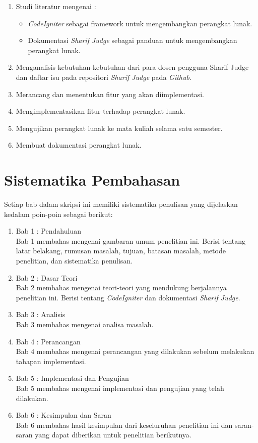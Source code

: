\begin{enumerate}
	\item Studi literatur mengenai :
		\begin{itemize}
			\item \textit{CodeIgniter} sebagai framework untuk mengembangkan perangkat lunak.
			\item Dokumentasi \textit{Sharif Judge} sebagai panduan untuk mengembangkan perangkat lunak.
		\end{itemize}
	\item Menganalisis kebutuhan-kebutuhan dari para dosen pengguna Sharif Judge dan daftar isu pada repositori \textit{Sharif Judge} pada \textit{Github}.
	\item Merancang dan menentukan fitur yang akan diimplementasi.
	\item Mengimplementasikan fitur terhadap perangkat lunak.
	\item Mengujikan perangkat lunak ke mata kuliah selama satu semester.
	\item Membuat dokumentasi perangkat lunak.
\end{enumerate}

\section{Sistematika Pembahasan}
\label{sec:sispem}
Setiap bab dalam skripsi ini memiliki sistematika penulisan yang dijelaskan kedalam poin-poin sebagai berikut:

\begin{enumerate}
	\item Bab 1 : Pendahuluan \\
	Bab 1 membahas mengenai gambaran umum penelitian ini. Berisi tentang latar belakang, rumusan masalah, tujuan, batasan masalah, metode penelitian, dan sistematika penulisan.
	
	\item Bab 2 : Dasar Teori \\
	Bab 2 membahas mengenai teori-teori yang mendukung berjalannya penelitian ini. Berisi tentang \textit{CodeIgniter} dan dokumentasi \textit{Sharif Judge}.
	
	\item Bab 3 : Analisis \\
	Bab 3 membahas mengenai analisa masalah.
	
	\item Bab 4 : Perancangan \\
	Bab 4 membahas mengenai perancangan yang dilakukan sebelum melakukan tahapan implementasi.
	
	\item Bab 5 : Implementasi dan Pengujian \\
	Bab 5 membahas mengenai implementasi dan pengujian yang telah dilakukan.
	
	\item Bab 6 : Kesimpulan dan Saran \\
	Bab 6 membahas hasil kesimpulan dari keseluruhan penelitian ini dan saran-saran yang dapat diberikan untuk penelitian berikutnya.
\end{enumerate}